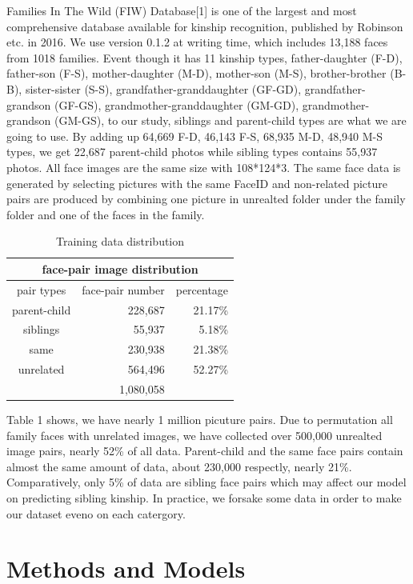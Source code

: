 \documentclass{article}
\begin{document}
Families In The Wild (FIW) Database[1] is one of the largest and most
comprehensive database available for kinship recognition, published by Robinson
etc. in 2016. We use version 0.1.2 at writing time, which includes 13,188 faces
from 1018 families.  Event though it has 11 kinship types, father-daughter
(F-D), father-son (F-S), mother-daughter (M-D), mother-son (M-S),
brother-brother (B-B), sister-sister (S-S), grandfather-granddaughter (GF-GD),
grandfather-grandson (GF-GS), grandmother-granddaughter (GM-GD),
grandmother-grandson (GM-GS), to our study, siblings and parent-child types are
what we are going to use. By adding up 64,669 F-D, 46,143 F-S, 68,935 M-D,
48,940 M-S types, we get 22,687 parent-child photos while sibling types
contains 55,937 photos. All face images are the same size with 108*124*3.  The
same face data is generated by selecting pictures with the same FaceID and
non-related picture pairs are produced by combining one picture in unrealted
folder under the family folder and one of the faces in the family.

\begin{table}[h]
	\centering
	\begin{tabular}{ | c || r r | }
		\hline
		\multicolumn{3}{|c|}{face-pair image distribution} \\
		\hline
		pair types&face-pair number&percentage\\
		\hline
			parent-child & 228,687 &21.17\% \\
			siblings & 55,937 & 5.18\% \\
			same & 230,938 & 21.38\% \\
			unrelated & 564,496 & 52.27\% \\
		\hline
			& 1,080,058 & \\
		\hline
	\end{tabular}
	\caption{Training data distribution}
	\label{table:1}
\end{table}

Table 1 shows, we have nearly 1 million picuture pairs. Due to permutation all
family faces with unrelated images, we have collected over 500,000 unrealted
image pairs, nearly 52\% of all data. Parent-child and the same face pairs
contain almost the same amount of data, about 230,000 respectly, nearly 21\%.
Comparatively, only 5\% of data are sibling face pairs which may affect our
model on predicting sibling kinship. In practice, we forsake some data in order
to make our dataset eveno on each catergory.

\section{Methods and Models}
\end{document}
